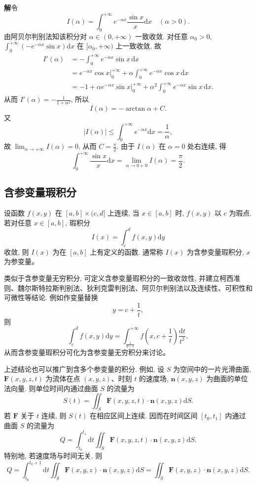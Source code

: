 \documentclass[UTF8, 12pt, fontset=fandol, oneside]{ctexart}
\begin{document}
\noindent\textbf{解}\quad 令
\[
  I(\alpha)=\int_0^{+\infty}e^{-\alpha x}\frac{\sin x}{x}\mathrm dx\quad(\alpha>0).
\]
由阿贝尔判别法知该积分对 $\alpha\in(0,+\infty)$ 一致收敛. 对任意 $\alpha_0>0$, $\int_0^{+\infty}(-e^{-\alpha x}\sin x)\mathrm dx$ 在 $[\alpha_0,+\infty)$ 上一致收敛, 故
\[
\begin{aligned}
  I'(\alpha)
  &=-\int_0^{+\infty}e^{-\alpha x}\sin x\,\mathrm dx\\
  &=e^{-\alpha x}\cos x\Big|_0^{+\infty}
    +\alpha\int_0^{+\infty}e^{-\alpha x}\cos x\,\mathrm dx\\
  &=-1+\alpha e^{-\alpha x}\sin x\Big|_0^{+\infty}
    +\alpha^2\int_0^{+\infty}e^{-\alpha x}\sin x\,\mathrm dx.
\end{aligned}
\]
从而 $I'(\alpha)=-\frac1{1+\alpha^2}$, 所以
\[
  I(\alpha)=-\arctan\alpha+C.
\]
又
\[
  |I(\alpha)|\leqslant\int_0^{+\infty}e^{-\alpha x}\mathrm dx=\frac1\alpha,
\]
故 $\lim_{\alpha\to+\infty}I(\alpha)=0$, 从而 $C=\frac\pi2$. 由于 $I(\alpha)$ 在 $\alpha=0$ 处右连续, 得
\[
  \int_0^{+\infty}\frac{\sin x}{x}\mathrm dx
  =\lim_{\alpha\to0+0}I(\alpha)=\frac\pi2.
\]

\subsection{含参变量瑕积分}

设函数 $f(x,y)$ 在 $[a,b]\times(c,d]$ 上连续, 当 $x\in[a,b]$ 时, $f(x,y)$ 以 $c$ 为瑕点. 若对任意 $x\in[a,b]$, 瑕积分
\begin{equation}
  I(x)=\int_c^d f(x,y)\mathrm dy
  \tag{17.2.4}
\end{equation}
收敛, 则 $I(x)$ 为在 $[a,b]$ 上有定义的函数. 通常称 $I(x)$ 为含参变量瑕积分, $x$ 为参变量。

类似于含参变量无穷积分, 可定义含参变量瑕积分的一致收敛性, 并建立柯西准则、魏尔斯特拉斯判别法、狄利克雷判别法、阿贝尔判别法以及连续性、可积性和可微性等结论. 例如作变量替换
\[
  y=c+\frac1t,
\]
则
\[
  \int_c^d f(x,y)\mathrm dy
  =
  \int_{\frac1{d-c}}^{+\infty}
  f\left(x,c+\frac1t\right)\frac{\mathrm dt}{t^2},
\]
从而含参变量瑕积分可化为含参变量无穷积分来讨论。

上述结论也可以推广到含多个参变量的积分. 例如, 设 $S$ 为空间中的一片光滑曲面, $\mathbf F(x,y,z,t)$ 为流体在点 $(x,y,z)$、时刻 $t$ 的速度场, $\mathbf n(x,y,z)$ 为曲面的单位法向量. 则单位时间内通过曲面 $S$ 的流量为
\[
  S(t)=\iint_S \mathbf F(x,y,z,t)\cdot\mathbf n(x,y,z)\mathrm dS.
\]
若 $\mathbf F$ 关于 $t$ 连续, 则 $S(t)$ 在相应区间上连续. 因而在时间区间 $[t_0,t_1]$ 内通过曲面 $S$ 的流量为
\[
  Q=\int_{t_0}^{t_1}\mathrm dt
  \iint_S \mathbf F(x,y,z,t)\cdot\mathbf n(x,y,z)\mathrm dS.
\]
特别地, 若速度场与时间无关, 则
\[
  Q=\int_{t_0}^{t_0+1}\mathrm dt
  \iint_S \mathbf F(x,y,z)\cdot\mathbf n(x,y,z)\mathrm dS
  =\iint_S \mathbf F(x,y,z)\cdot\mathbf n(x,y,z)\mathrm dS.
\]
\end{document}
